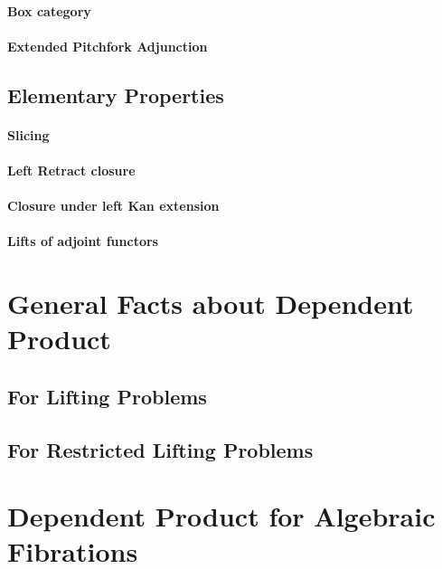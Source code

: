 \documentclass[reqno,10pt,a4paper,oneside]{amsart}
\begin{document}
\paragraph{Box category}

\paragraph{Extended Pitchfork Adjunction}

\subsection{Elementary Properties}

\paragraph{Slicing}

\paragraph{Left Retract closure}

\paragraph{Closure under left Kan extension}

\paragraph{Lifts of adjoint functors}

\section{General Facts about Dependent Product}

\subsection{For Lifting Problems}

\subsection{For Restricted Lifting Problems}

\section{Dependent Product for Algebraic Fibrations}
\end{document}
